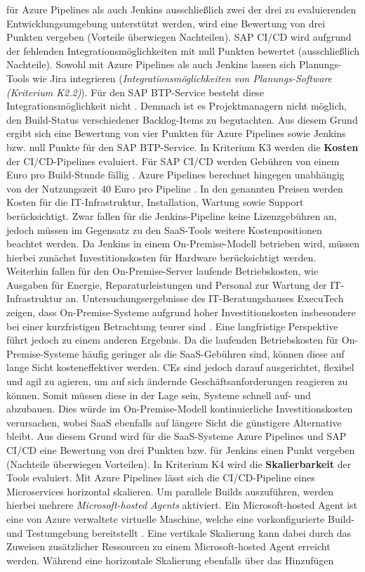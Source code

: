 für Azure Pipelines als auch Jenkins ausschließlich zwei der drei zu evaluierenden Entwicklungsumgebung unterstützt werden, wird eine Bewertung von drei Punkten vergeben (Vorteile überwiegen Nachteilen). SAP CI/CD wird aufgrund der fehlenden Integrationsmöglichkeiten mit null Punkten bewertet (ausschließlich Nachteile). Sowohl mit Azure Pipelines als auch Jenkins lassen sich Planungs-Tools wie Jira integrieren (\textit{Integrationsmöglichkeiten von Planungs-Software (Kriterium K2.2)}). Für den SAP BTP-Service besteht diese Integrationsmöglichkeit nicht \cite[Z. 98 ff.]{TestDeveloperSAPHyperspaceAdoption&Onboarding.}. Demnach ist es Projektmanagern nicht möglich, den Build-Status verschiedener Backlog-Items zu begutachten. Aus diesem Grund ergibt sich eine Bewertung von vier Punkten für Azure Pipelines sowie Jenkins bzw. null Punkte für den SAP BTP-Service. In Kriterium K3 werden die \textbf{Kosten} der CI/CD-Pipelines evaluiert. Für SAP CI/CD werden Gebühren von einem Euro pro Build-Stunde fällig \cite[Z. 103 ff.]{ProductOwnerSAPBTPProd&Infra.}. Azure Pipelines berechnet hingegen unabhängig von der Nutzungszeit 40 Euro pro Pipeline \cite{.20230410}. In den genannten Preisen werden Kosten für die IT-Infrastruktur, Installation, Wartung sowie Support berücksichtigt. Zwar fallen für die Jenkins-Pipeline keine Lizenzgebühren an, jedoch müssen im Gegensatz zu den SaaS-Tools weitere Kostenpositionen beachtet werden. Da Jenkins in einem On-Premise-Modell betrieben wird, müssen hierbei zunächst Investitionskosten für Hardware berücksichtigt werden. Weiterhin fallen für den On-Premise-Server laufende Betriebskosten, wie Ausgaben für Energie, Reparaturleistungen und Personal zur Wartung der IT-Infrastruktur an. Untersuchungsergebnisse des IT-Beratungshauses ExecuTech zeigen, dass On-Premise-Systeme aufgrund hoher Investitionskosten insbesondere bei einer kurzfristigen Betrachtung teurer sind \cite{Executech.20230308}. Eine langfristige Perspektive führt jedoch zu einem anderen Ergebnis. Da die laufenden Betriebskosten für On-Premise-Systeme häufig geringer als die SaaS-Gebühren sind, können diese auf lange Sicht kosteneffektiver werden. CEs sind jedoch darauf ausgerichtet, flexibel und agil zu agieren, um auf sich ändernde Geschäftsanforderungen reagieren zu können. Somit müssen diese in der Lage sein, Systeme schnell auf- und abzubauen. Dies würde im On-Premise-Modell kontinuierliche Investitionskosten verursachen, wobei SaaS ebenfalls auf längere Sicht die günstigere Alternative bleibt. Aus diesem Grund wird für die SaaS-Systeme Azure Pipelines und SAP CI/CD eine Bewertung von drei Punkten bzw. für Jenkins einen Punkt vergeben (Nachteile überwiegen Vorteilen). In Kriterium K4 wird die \textbf{Skalierbarkeit} der Tools evaluiert. Mit Azure Pipelines lässt sich die CI/CD-Pipeline eines Microservices horizontal skalieren. Um parallele Builds auszuführen, werden hierbei mehrere \textit{Microsoft-hosted Agents} aktiviert. Ein Microsoft-hosted Agent ist eine von Azure verwaltete virtuelle Maschine, welche eine vorkonfigurierte Build- und Testumgebung bereitstellt \cite{Steved0x.20230410b}. Eine vertikale Skalierung kann dabei durch das Zuweisen zusätzlicher Ressourcen zu einem Microsoft-hosted Agent erreicht werden. Während eine horizontale Skalierung ebenfalls über das Hinzufügen 